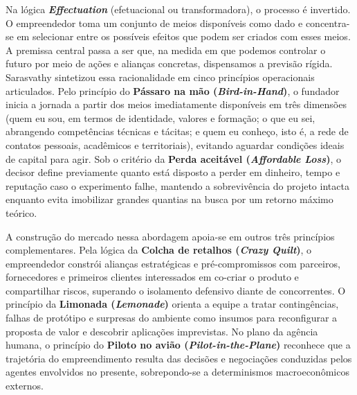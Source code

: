 Na lógica \textbf{\textit{Effectuation}} (efetuacional ou transformadora), o processo é invertido. O empreendedor toma um conjunto de meios disponíveis como dado e concentra-se em selecionar entre os possíveis efeitos que podem ser criados com esses meios. A premissa central passa a ser que, na medida em que podemos controlar o futuro por meio de ações e alianças concretas, dispensamos a previsão rígida. Sarasvathy sintetizou essa racionalidade em cinco princípios operacionais articulados. Pelo princípio do \textbf{Pássaro na mão (\textit{Bird-in-Hand})}, o fundador inicia a jornada a partir dos meios imediatamente disponíveis em três dimensões (quem eu sou, em termos de identidade, valores e formação; o que eu sei, abrangendo competências técnicas e tácitas; e quem eu conheço, isto é, a rede de contatos pessoais, acadêmicos e territoriais), evitando aguardar condições ideais de capital para agir. Sob o critério da \textbf{Perda aceitável (\textit{Affordable Loss})}, o decisor define previamente quanto está disposto a perder em dinheiro, tempo e reputação caso o experimento falhe, mantendo a sobrevivência do projeto intacta enquanto evita imobilizar grandes quantias na busca por um retorno máximo teórico.

A construção do mercado nessa abordagem apoia-se em outros três princípios complementares. Pela lógica da \textbf{Colcha de retalhos (\textit{Crazy Quilt})}, o empreendedor constrói alianças estratégicas e pré-compromissos com parceiros, fornecedores e primeiros clientes interessados em co-criar o produto e compartilhar riscos, superando o isolamento defensivo diante de concorrentes. O princípio da \textbf{Limonada (\textit{Lemonade})} orienta a equipe a tratar contingências, falhas de protótipo e surpresas do ambiente como insumos para reconfigurar a proposta de valor e descobrir aplicações imprevistas. No plano da agência humana, o princípio do \textbf{Piloto no avião (\textit{Pilot-in-the-Plane})} reconhece que a trajetória do empreendimento resulta das decisões e negociações conduzidas pelos agentes envolvidos no presente, sobrepondo-se a determinismos macroeconômicos externos.

